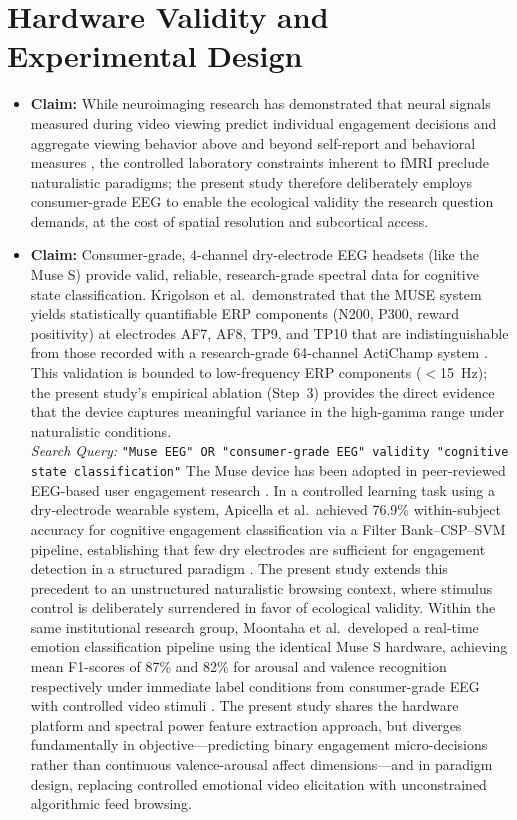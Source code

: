 \documentclass[12pt,a4paper]{report}
\begin{document}
\section{Hardware Validity and Experimental Design}
\begin{itemize}
    \item \textbf{Claim:} While neuroimaging research has demonstrated that neural signals measured during video viewing predict individual engagement decisions and aggregate viewing behavior above and beyond self-report and behavioral measures \cite{tong_brain_2020}, the controlled laboratory constraints inherent to fMRI preclude naturalistic paradigms; the present study therefore deliberately employs consumer-grade EEG to enable the ecological validity the research question demands, at the cost of spatial resolution and subcortical access.

    \item \textbf{Claim:} Consumer-grade, 4-channel dry-electrode EEG headsets (like the Muse S) provide valid, reliable, research-grade spectral data for cognitive state classification. Krigolson et al.\ demonstrated that the MUSE system yields statistically quantifiable ERP components (N200, P300, reward positivity) at electrodes AF7, AF8, TP9, and TP10 that are indistinguishable from those recorded with a research-grade 64-channel ActiChamp system \cite{krigolson_choosing_2017}. This validation is bounded to low-frequency ERP components ($<$15~Hz); the present study's empirical ablation (Step~3) provides the direct evidence that the device captures meaningful variance in the high-gamma range under naturalistic conditions.\\
    \textit{Search Query:} \texttt{"Muse EEG" OR "consumer-grade EEG" validity "cognitive state classification"} The Muse device has been adopted in peer-reviewed EEG-based user engagement research \cite{bellos_methods_2025}. In a controlled learning task using a dry-electrode wearable system, Apicella et al.\ achieved 76.9\% within-subject accuracy for cognitive engagement classification via a Filter Bank--CSP--SVM pipeline, establishing that few dry electrodes are sufficient for engagement detection in a structured paradigm \cite{apicella_eeg-based_2022}. The present study extends this precedent to an unstructured naturalistic browsing context, where stimulus control is deliberately surrendered in favor of ecological validity. Within the same institutional research group, Moontaha et al.\ developed a real-time emotion classification pipeline using the identical Muse S hardware, achieving mean F1-scores of 87\% and 82\% for arousal and valence recognition respectively under immediate label conditions from consumer-grade EEG with controlled video stimuli \cite{moontaha_online_2023-1}. The present study shares the hardware platform and spectral power feature extraction approach, but diverges fundamentally in objective---predicting binary engagement micro-decisions rather than continuous valence-arousal affect dimensions---and in paradigm design, replacing controlled emotional video elicitation with unconstrained algorithmic feed browsing.


\end{itemize}
\end{document}
